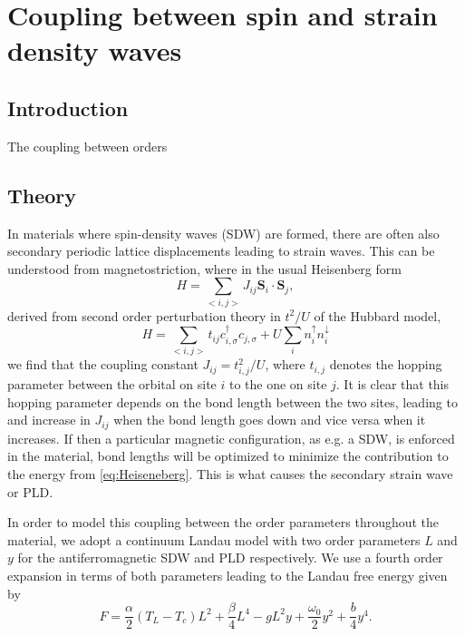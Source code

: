 \chapter{Coupling between spin and strain density waves}
\section{Introduction}
The coupling between orders

\section{Theory}

In materials where spin-density waves (SDW) are formed, there are often also secondary periodic lattice displacements leading to strain waves. This can be understood from magnetostriction, where in the usual Heisenberg form
\begin{equation}
	\label{eq:Heisenberg}
	H = \sum_{<i,j>}J_{ij} \mathbf{S}_i \cdot \mathbf{S}_j,
\end{equation}
derived from second order perturbation theory in $t^2/U$ of the Hubbard model,
\begin{equation}
	H = \sum_{<i,j>}t_{ij} c_{i,\sigma}^{\dag} c_{j,\sigma}  + U \sum_i n_i^{\uparrow} n_i^{\downarrow}
\end{equation}
we find  that the coupling constant $J_{ij}=t_{i,j}^2/U$, where $t_{i,j}$ denotes the hopping parameter between the orbital on site $i$ to the one on site $j$. It is clear that this hopping parameter depends on the bond length between the two sites, leading to and increase in $J_{ij}$ when the bond length goes down and vice versa when it increases. If then a particular magnetic configuration, as e.g. a SDW, is enforced in the material, bond lengths will be optimized to minimize the contribution to the energy from \ref{eq:Heiseneberg}. This is what causes the secondary strain wave or PLD.

In order to model this coupling between the order parameters throughout the material, we adopt a continuum Landau model with two order parameters $L$ and $y$ for the antiferromagnetic SDW and PLD respectively. We use a fourth order expansion in terms of both parameters leading to the Landau free energy given by
\begin{equation}
	\label{eq:landau}
	F = \frac{\alpha}{2}(T_L-T_c) L^2 + \frac{\beta}{4} L^4 - g L^2 y + \frac{\omega_0}{2} y^2 + \frac{b}{4} y^4.
\end{equation}

